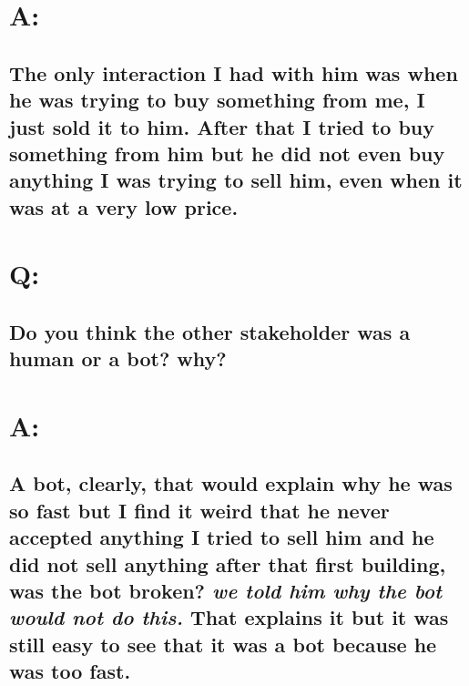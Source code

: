 \section*{A:}
\subsection*{The only interaction I had with him was when he was trying to buy something from me, I just sold it to him. After that I tried to buy something from him but he did not even buy anything I was trying to sell him, even when it was at a very low price.}

\section*{Q:}
\subsection*{Do you think the other stakeholder was a human or a bot? why?}

\section*{A:}
\subsection*{A bot, clearly, that would explain why he was so fast but I find it weird that he never accepted anything I tried to sell him and he did not sell anything after that first building, was the bot broken? \textit{we told him why the bot would not do this.} That explains it but it was still easy to see that it was a bot because he was too fast.}